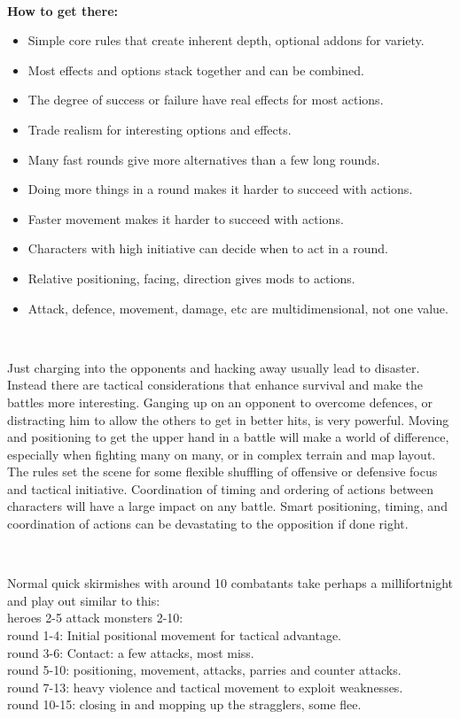\

\textbf{How to get there:}
\begin{itemize}
    \item Simple core rules that create inherent depth, optional addons for variety.
    \item Most effects and options stack together and can be combined.
    \item The degree of success or failure have real effects for most actions.
    \item Trade realism for interesting options and effects.
    \item Many fast rounds give more alternatives than a few long rounds.
    \item Doing more things in a round makes it harder to succeed with actions.
    \item Faster movement makes it harder to succeed with actions.
    \item Characters with high initiative can decide when to act in a round.
    \item Relative positioning, facing, direction gives mods to actions.
    \item Attack, defence, movement, damage, etc are multidimensional, not one value.
\end{itemize}

\

Just charging into the opponents and hacking away usually lead to disaster. Instead there are tactical considerations that enhance survival and make the battles more interesting. Ganging up on an opponent to overcome defences, or distracting him to allow the others to get in better hits, is very powerful. Moving and positioning to get the upper hand in a battle will make a world of difference, especially when fighting many on many, or in complex terrain and map layout. The rules set the scene for some flexible shuffling of offensive or defensive focus and tactical initiative. Coordination of timing and ordering of actions between characters will have a large impact on any battle. Smart positioning, timing, and coordination of actions can be devastating to the opposition if done right.

\

Normal quick skirmishes with around 10 combatants take perhaps a millifortnight and play out similar to this: \\
heroes 2-5 attack monsters 2-10: \\
round 1-4: Initial positional movement for tactical advantage. \\
round 3-6: Contact: a few attacks, most miss. \\
round 5-10: positioning, movement, attacks, parries and counter attacks. \\
round 7-13: heavy violence and tactical movement to exploit weaknesses. \\
round 10-15: closing in and mopping up the stragglers, some flee.

